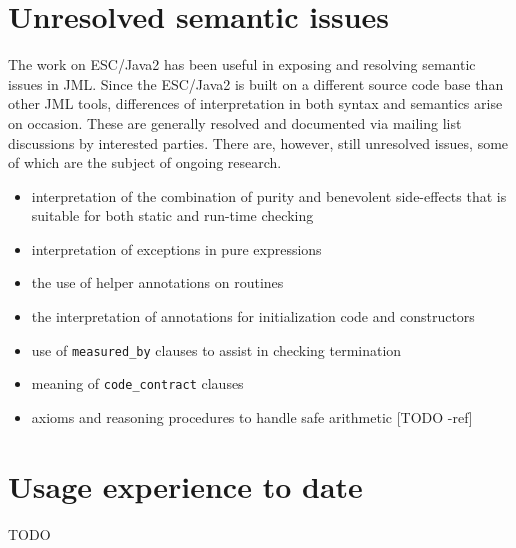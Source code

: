 \documentclass{acm_proc_article-sp}
\begin{document}
\section{Unresolved semantic issues}
The work on ESC/Java2 has been useful in exposing and resolving semantic issues in JML.
Since the ESC/Java2 is built on a different source code base than other JML tools, 
differences of interpretation in both syntax and semantics arise on occasion.  These are
generally resolved and documented via mailing list discussions by interested parties.
There are, however, still unresolved issues, some of which are the subject of ongoing
research.
\setlength{\partopsep}{0in}\setlength{\parskip}{0in}
\begin{itemize}\setlength{\itemsep}{0in}
\item interpretation of the combination of purity and benevolent side-effects that is
suitable for both static and run-time checking
\item interpretation of exceptions in pure expressions
\item the use of helper annotations on routines
\item the interpretation of annotations for initialization code and constructors
\item use of {\tt measured\_by} clauses to assist in checking termination
\item meaning of {\tt code\_contract} clauses
\item axioms and reasoning procedures to handle safe arithmetic [TODO -ref]
\end{itemize}

\section{Usage experience to date}
TODO
\end{document}
